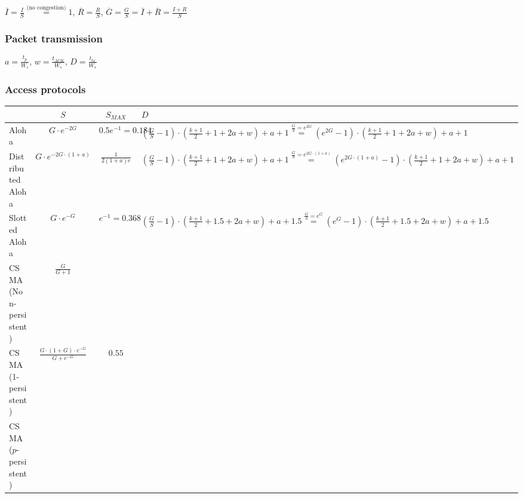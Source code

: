 \documentclass[../main.tex]{subfiles}
\begin{document}
$\overline{I} = \frac {I} {S} \overset{\text{(no congestion)}}{=} 1$, 
$\overline{R} = \frac {R} {S}$, 
$\overline{G} = \frac {G} {S} = \overline{I} + \overline{R} = \frac {I + R} {S}$

\subsubsection{Packet transmission}

$a = \frac {t_p} {W_s}$, 
$w = \frac {t_{ACK}} {W_s}$, 
$D = \frac {t_{tx}} {W_s}$

\subsubsection{Access protocols}

\begin{tabular}{|p{2cm}|c|c|p{8cm}|}
	\hline
	& $S$ & $S_{MAX}$ & $D$ \\
	\hline
	Aloha & $G \cdot e^{-2G}$ & $0.5 e^{-1} = 0.184$ & $\left( \frac {G} {S} - 1 \right) \cdot \left( \frac {k+1} {2} + 1 + 2a + w \right) + a + 1 \overset{\frac {G} {S} = e^{2G}}{=} \left( e^{2G} - 1 \right) \cdot \left( \frac {k+1} {2} + 1 + 2a + w \right) + a + 1$ \\
	\hline
	Distributed Aloha & $G \cdot e^{-2G \cdot (1+a)}$ & $\frac {1} {2 (1+a) e}$ & $\left( \frac {G} {S} - 1 \right) \cdot \left( \frac {k+1} {2} + 1 + 2a + w \right) + a + 1 \overset{\frac {G} {S} = e^{2G \cdot (1+a)}}{=} \left( e^{2G \cdot (1+a)} - 1 \right) \cdot \left( \frac {k+1} {2} + 1 + 2a + w \right) + a + 1$ \\
	\hline
	Slotted Aloha & $G \cdot e^{-G}$ & $e^{-1} = 0.368$ & $\left( \frac {G} {S} - 1 \right) \cdot \left( \frac {k+1} {2} + 1.5 + 2a + w \right) + a + 1.5 \overset{\frac {G} {S} = e^G}{=} \left( e^G - 1 \right) \cdot \left( \frac {k+1} {2} + 1.5 + 2a + w \right) + a + 1.5$ \\
	\hline
	CSMA (Non-persistent) & $\frac {G} {G+1}$ & & \\
	\hline
	CSMA (1-persistent) & $\frac {G \cdot (1 + G) \cdot e^{-G}} {G + e^{-G}}$ & $0.55$ & \\
	\hline
	CSMA ($p$-persistent) & & & \\
	\hline
\end{tabular}
\end{document}
